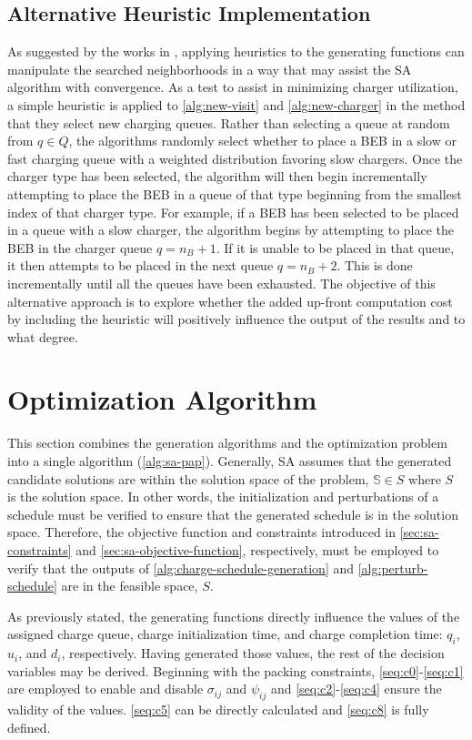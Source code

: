 \documentclass[energies,article,submit,moreauthors]{Definitions/mdpi}
\newcommand{\Sol}{\mathbb{S}}               %
\begin{document}
\subsection{Alternative Heuristic Implementation}
\label{sec:sa-heuristic-implementation}
As suggested by the works in \cite{Zhang_2010,Xinchao_2011}, applying heuristics to the generating functions can
manipulate the searched neighborhoods in a way that may assist the SA algorithm with convergence. As a test to assist in
minimizing charger utilization, a simple heuristic is applied to \ref{alg:new-visit} and \ref{alg:new-charger} in the
method that they select new charging queues. Rather than selecting a queue at random from \(q \in Q\), the algorithms
randomly select whether to place a BEB in a slow or fast charging queue with a weighted distribution favoring slow
chargers. Once the charger type has been selected, the algorithm will then begin incrementally attempting to place the
BEB in a queue of that type beginning from the smallest index of that charger type. For example, if a BEB has been
selected to be placed in a queue with a slow charger, the algorithm begins by attempting to place the BEB in the charger
queue \(q = n_B + 1\). If it is unable to be placed in that queue, it then attempts to be placed in the next queue \(q =
n_B + 2\). This is done incrementally until all the queues have been exhausted. The objective of this alternative
approach is to explore whether the added up-front computation cost by including the heuristic will positively influence
the output of the results and to what degree.
\section{Optimization Algorithm}
\label{sec:sa-optimization-algorithm}
This section combines the generation algorithms and the optimization problem into a single algorithm (\ref{alg:sa-pap}).
Generally, SA assumes that the generated candidate solutions are within the solution space of the problem, \(\Sol \in S\)
where \(S\) is the solution space. In other words, the initialization and perturbations of a schedule must be verified to
ensure that the generated schedule is in the solution space. Therefore, the objective function and constraints
introduced in \ref{sec:sa-constraints} and \ref{sec:sa-objective-function}, respectively, must be employed to verify that the
outputs of \ref{alg:charge-schedule-generation} and \ref{alg:perturb-schedule} are in the feasible space, \(S\).

As previously stated, the generating functions directly influence the values of the assigned charge queue, charge
initialization time, and charge completion time: \(q_i\), \(u_i\), and \(d_i\), respectively. Having generated those values,
the rest of the decision variables may be derived. Beginning with the packing constraints, \ref{seq:c0}-\ref{seq:c1} are
employed to enable and disable \(\sigma_{ij}\) and \(\psi_{ij}\) and \ref{seq:c2}-\ref{seq:c4} ensure the validity of the values.
\ref{seq:c5} can be directly calculated and \ref{seq:c8} is fully defined.
\end{document}
